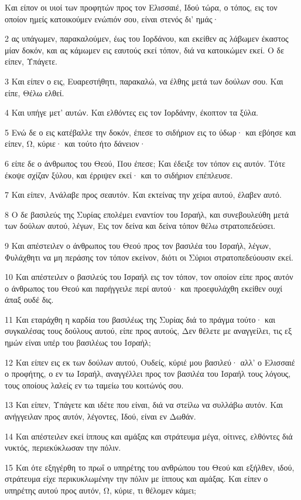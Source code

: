 \par Και είπον οι υιοί των προφητών προς τον Ελισσαιέ, Ιδού τώρα, ο τόπος, εις τον οποίον ημείς κατοικούμεν ενώπιόν σου, είναι στενός δι' ημάς·
\par 2 ας υπάγωμεν, παρακαλούμεν, έως του Ιορδάνου, και εκείθεν ας λάβωμεν έκαστος μίαν δοκόν, και ας κάμωμεν εις εαυτούς εκεί τόπον, διά να κατοικώμεν εκεί. Ο δε είπεν, Υπάγετε.
\par 3 Και είπεν ο εις, Ευαρεστήθητι, παρακαλώ, να έλθης μετά των δούλων σου. Και είπε, Θέλω ελθεί.
\par 4 Και υπήγε μετ' αυτών. Και ελθόντες εις τον Ιορδάνην, έκοπτον τα ξύλα.
\par 5 Ενώ δε ο εις κατέβαλλε την δοκόν, έπεσε το σιδήριον εις το ύδωρ· και εβόησε και είπεν, Ω, κύριε· και τούτο ήτο δάνειον·
\par 6 είπε δε ο άνθρωπος του Θεού, Που έπεσε; Και έδειξε τον τόπον εις αυτόν. Τότε έκοψε σχίζαν ξύλου, και έρριψεν εκεί· και το σιδήριον επέπλευσε.
\par 7 Και είπεν, Ανάλαβε προς σεαυτόν. Και εκτείνας την χείρα αυτού, έλαβεν αυτό.
\par 8 Ο δε βασιλεύς της Συρίας επολέμει εναντίον του Ισραήλ, και συνεβουλεύθη μετά των δούλων αυτού, λέγων, Εις τον δείνα και δείνα τόπον θέλω στρατοπεδεύσει.
\par 9 Και απέστειλεν ο άνθρωπος του Θεού προς τον βασιλέα του Ισραήλ, λέγων, Φυλάχθητι να μη περάσης τον τόπον εκείνον, διότι οι Σύριοι στρατοπεδεύουσιν εκεί.
\par 10 Και απέστειλεν ο βασιλεύς του Ισραήλ εις τον τόπον, τον οποίον είπε προς αυτόν ο άνθρωπος του Θεού και παρήγγειλε περί αυτού· και προεφυλάχθη εκείθεν ουχί άπαξ ουδέ δις.
\par 11 Και εταράχθη η καρδία του βασιλέως της Συρίας διά το πράγμα τούτο· και συγκαλέσας τους δούλους αυτού, είπε προς αυτούς, Δεν θέλετε με αναγγείλει, τις εξ ημών είναι υπέρ του βασιλέως του Ισραήλ;
\par 12 Και είπεν εις εκ των δούλων αυτού, Ουδείς, κύριέ μου βασιλεύ· αλλ' ο Ελισσαιέ ο προφήτης, ο εν τω Ισραήλ, αναγγέλλει προς τον βασιλέα του Ισραήλ τους λόγους, τους οποίους λαλείς εν τω ταμείω του κοιτώνός σου.
\par 13 Και είπεν, Υπάγετε και ιδέτε που είναι, διά να στείλω να συλλάβω αυτόν. Και ανήγγειλαν προς αυτόν, λέγοντες, Ιδού, είναι εν Δωθάν.
\par 14 Και απέστειλεν εκεί ίππους και αμάξας και στράτευμα μέγα, οίτινες, ελθόντες διά νυκτός, περιεκύκλωσαν την πόλιν.
\par 15 Και ότε εξηγέρθη το πρωΐ ο υπηρέτης του ανθρώπου του Θεού και εξήλθεν, ιδού, στράτευμα είχε περικυκλωμένην την πόλιν με ίππους και αμάξας. Και είπεν ο υπηρέτης αυτού προς αυτόν, Ω, κύριε, τι θέλομεν κάμει;
